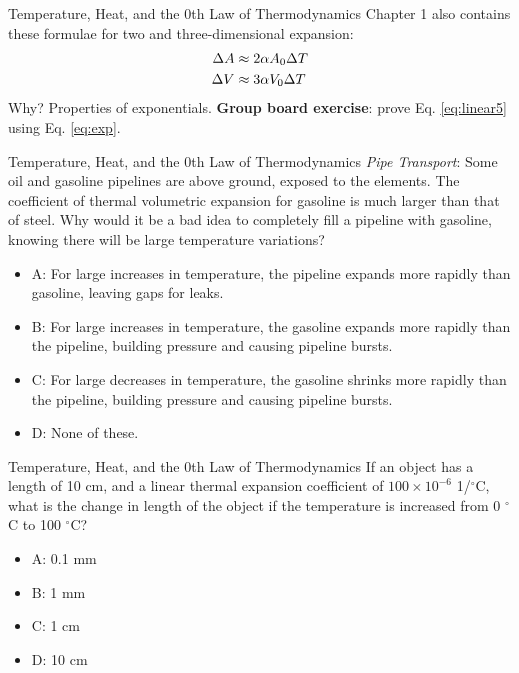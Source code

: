 \documentclass{beamer}
\begin{document}
\begin{frame}{Temperature, Heat, and the 0th Law of Thermodynamics} 
Chapter 1 also contains these formulae for two and three-dimensional expansion:
\begin{align}
\Delta A &\approx 2\alpha A_{\rm 0} \Delta T \label{eq:linear4} \\
\Delta V &\approx 3\alpha V_{\rm 0} \Delta T \label{eq:linear5}
\end{align}
Why?  Properties of exponentials.  \textbf{Group board exercise}: prove Eq. \ref{eq:linear5} using Eq. \ref{eq:exp}.
\end{frame}

\begin{frame}{Temperature, Heat, and the 0th Law of Thermodynamics}
\small
\textit{Pipe Transport}: Some oil and gasoline pipelines are above ground, exposed to the elements.  The coefficient of thermal volumetric expansion for gasoline is much larger than that of steel.  Why would it be a bad idea to completely fill a pipeline with gasoline, knowing there will be large temperature variations?
\begin{itemize}
\item A: For large increases in temperature, the pipeline expands more rapidly than gasoline, leaving gaps for leaks.
\item B: For large increases in temperature, the gasoline expands more rapidly than the pipeline, building pressure and causing pipeline bursts.
\item C: For large decreases in temperature, the gasoline shrinks more rapidly than the pipeline, building pressure and causing pipeline bursts.
\item D: None of these.
\end{itemize}
\end{frame}

\begin{frame}{Temperature, Heat, and the 0th Law of Thermodynamics}
If an object has a length of 10 cm, and a linear thermal expansion coefficient of $100 \times 10^{-6}$ 1/$^{\circ}$C, what is the change in length of the object if the temperature is increased from 0 $^{\circ}$C to 100 $^{\circ}$C?
\begin{itemize}
\item A: 0.1 mm
\item B: 1 mm
\item C: 1 cm
\item D: 10 cm
\end{itemize}
\end{frame}
\end{document}
